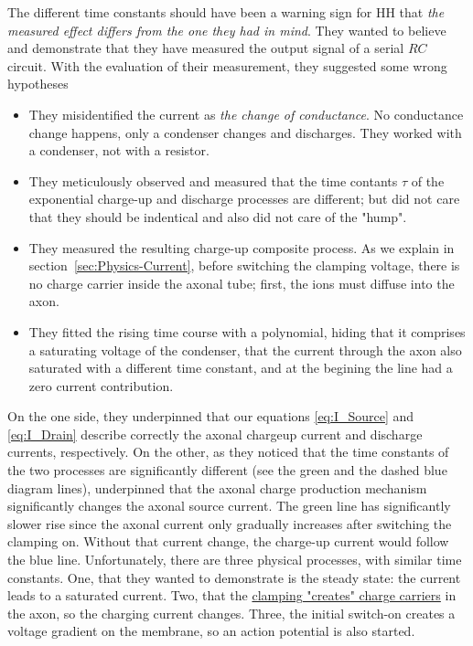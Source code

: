   The different time constants should have been a warning sign for HH that
  \textit{the measured effect differs from the one they had in mind}.
%
They wanted to believe and demonstrate that they have measured the output signal
of a serial $RC$ circuit.
With the evaluation of their measurement, they suggested some wrong hypotheses 
\begin{itemize}
\item They misidentified the current as \textit{the 
change of conductance}. No conductance change happens, only a condenser 
changes and discharges. They worked with a condenser, not with a resistor.
\item They meticulously observed and measured that the time contants $\tau$
of the exponential charge-up and discharge processes are different;
but did not care that they should be indentical and also did not care of the "hump".
\item They measured the resulting charge-up composite process. As we explain in section~\ref{sec:Physics-Current},
before switching the clamping voltage, there is no charge carrier 
inside the axonal tube; first, the ions must diffuse into the axon.
\item They fitted the rising time course with a polynomial, hiding 
that it comprises a saturating voltage of the condenser, that 
the current through the axon also saturated with a different time constant, 
and at the begining the line had a zero current contribution.
\end{itemize} 
 

On the one side, they underpinned that our equations \ref{eq:I_Source} and \ref{eq:I_Drain}
describe correctly the axonal chargeup current and discharge currents, respectively.
On the other, as they noticed that the time constants of the two processes are significantly different
(see the green and the dashed blue diagram lines), underpinned that
the axonal charge production mechanism significantly changes
the axonal source current. The green line has significantly slower rise
since the axonal current only gradually increases after switching the clamping on.
Without that current change, the charge-up current would follow the blue line.
Unfortunately, there are three physical processes, with similar time constants.
One, that they wanted to demonstrate is the steady state:
the current leads to a saturated current. 
Two, that the \hyperlink{voltage-clamping}{clamping "creates" charge carriers} in the axon,
so the charging current changes.
Three, the initial switch-on creates a voltage gradient on the membrane,
so an action potential is also started.
 

